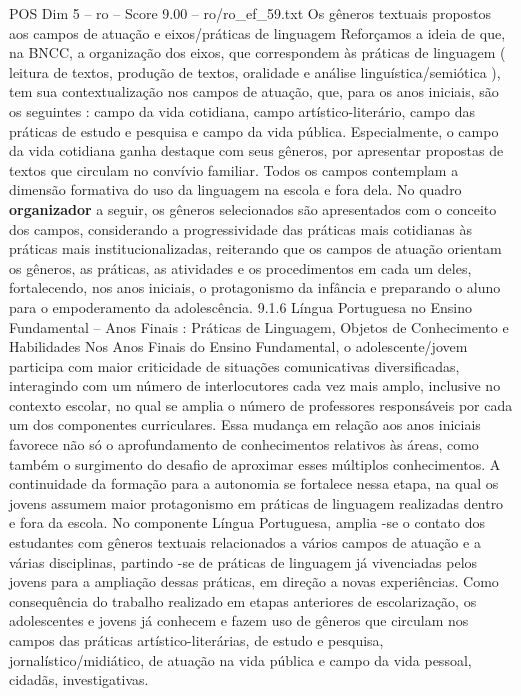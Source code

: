 \begin{textsample}{POS Dim 5 – ro – Score 9.00 – ro/ro\_ef\_59.txt}  \label{ex:f5_pos_117}
Os gêneros textuais propostos aos campos de atuação e eixos/práticas de linguagem Reforçamos a ideia de que, na BNCC, a organização dos eixos, que correspondem às práticas de linguagem ( leitura de textos, produção de textos, oralidade e análise linguística/semiótica ), tem sua contextualização nos campos de atuação, que, para os anos iniciais, são os seguintes : campo da vida cotidiana, campo artístico-literário, campo das práticas de estudo e pesquisa e campo da vida pública.
Especialmente, o campo da vida cotidiana ganha destaque com seus gêneros, por apresentar propostas de textos que circulam no convívio familiar.
Todos os campos contemplam a dimensão formativa do uso da linguagem na escola e fora dela.
No quadro \textbf{organizador} a seguir, os gêneros selecionados são apresentados com o conceito dos campos, considerando a progressividade das práticas mais cotidianas às práticas mais institucionalizadas, reiterando que os campos de atuação orientam os gêneros, as práticas, as atividades e os procedimentos em cada um deles, fortalecendo, nos anos iniciais, o protagonismo da infância e preparando o aluno para o empoderamento da adolescência. 9.1.6 Língua Portuguesa no Ensino Fundamental – Anos Finais : Práticas de Linguagem, Objetos de Conhecimento e Habilidades Nos Anos Finais do Ensino Fundamental, o adolescente/jovem participa com maior criticidade de situações comunicativas diversificadas, interagindo com um número de interlocutores cada vez mais amplo, inclusive no contexto escolar, no qual se amplia o número de professores responsáveis por cada um dos componentes curriculares.
Essa mudança em relação aos anos iniciais favorece não só o aprofundamento de conhecimentos relativos às áreas, como também o surgimento do desafio de aproximar esses múltiplos conhecimentos.
A continuidade da formação para a autonomia se fortalece nessa etapa, na qual os jovens assumem maior protagonismo em práticas de linguagem realizadas dentro e fora da escola.
No componente Língua Portuguesa, amplia -se o contato dos estudantes com gêneros textuais relacionados a vários campos de atuação e a várias disciplinas, partindo -se de práticas de linguagem já vivenciadas pelos jovens para a ampliação dessas práticas, em direção a novas experiências.
Como consequência do trabalho realizado em etapas anteriores de escolarização, os adolescentes e jovens já conhecem e fazem uso de gêneros que circulam nos campos das práticas artístico-literárias, de estudo e pesquisa, jornalístico/midiático, de atuação na vida pública e campo da vida pessoal, cidadãs, investigativas.

\end{textsample}
